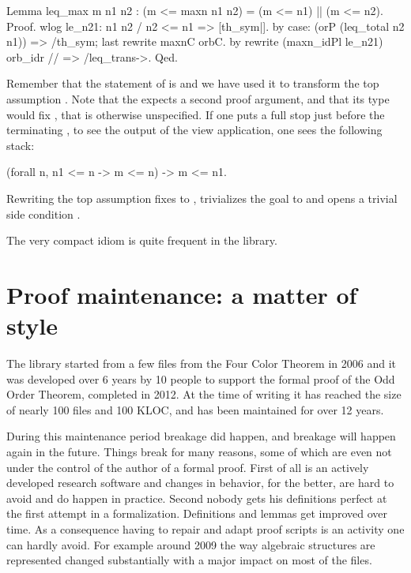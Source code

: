 \begin{coq}{}{}
Lemma leq_max m n1 n2 : (m <= maxn n1 n2) = (m <= n1) || (m <= n2).
Proof.
wlog le_n21: n1 n2 / n2 <= n1 => [th_sym|].
  by case: (orP (leq_total n2 n1)) => /th_sym; last rewrite maxnC orbC.
by rewrite (maxn_idPl le_n21) orb_idr // => /leq_trans->.
Qed.
\end{coq}

Remember that the statement of
 is  and
we have used it to transform the top assumption .  Note that
the  expects a second proof argument, and that its type
would fix , that is otherwise unspecified.  If one puts a
full stop just before the terminating \C{->}, to see the output of
the view application, one sees the following stack:

\begin{coq}{}{}
(forall n, n1 <= n -> m <= n) -> m <= n1.
\end{coq}

Rewriting the top assumption fixes  to , trivializes
the goal  to  and opens a trivial side
condition .

The very compact idiom  is quite frequent in the
\mcbMC{} library.

\section{Proof maintenance: a matter of style}

The \mcbMC{} library started from a few files from the Four Color
Theorem in 2006 and it was developed over 6 years by 10 people to
support the formal proof of the Odd Order Theorem, completed in 2012.
At the time of writing it has reached the size of nearly 100 files and
100 KLOC, and has been maintained for over 12 years.

During this maintenance period breakage did happen, and breakage will happen
again in the future. Things break for many reasons, some of which are even not
under the control of the author of a formal proof. First of all  \Coq{} is an
actively developed research software and changes in behavior, for the better,
are hard to avoid and do happen in practice. Second nobody gets his definitions
perfect at the first attempt in a formalization. Definitions and lemmas get
improved over time.  As a consequence having to repair and adapt proof scripts
is an activity one can hardly avoid.  For example around 2009 the way algebraic
structures are represented changed substantially with a major impact on most
of the files.

